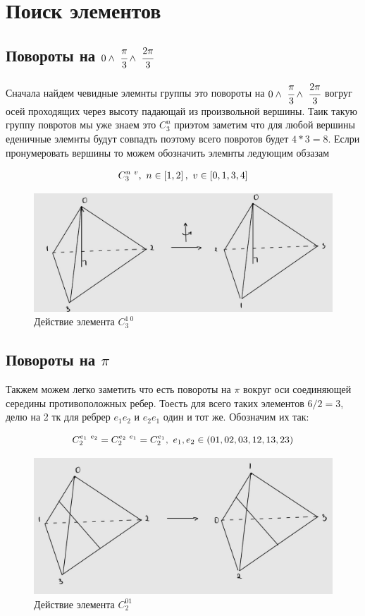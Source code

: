 \section{Поиск элементов}

\subsection{Повороты на $0 \land \ \cfrac{\pi}{3} \land \ \cfrac{2 \pi}{3}$}

Сначала найдем чевидные элемнты группы это повороты на 
$0 \land \ \cfrac{\pi}{3} \land \ \cfrac{2 \pi}{3}$ вогруг осей проходящих через 
высоту падающай из произвольной вершины. Таик такую группу 
повротов мы уже знаем это $C_3^n$ приэтом заметим что для любой вершины 
еденичные элемнты будут совпадть поэтому всего повротов будет $4*3 = 8$. 
Еслри пронумеровать вершины то можем обозначить элемнты ледующим обзазам

\begin{eqnarray}
    C_3^{n \ v}, \ n \in \left[ 1, 2 \right], \ v \in \left[ 0, 1, 3, 4 \right]
\end{eqnarray}

\begin{figure}[H]
    \centering
    \includegraphics[width=0.5\linewidth]{su/C_10_3.jpg}
    \caption{Действие элемента $C^{1 \ 0}_{3}$}
\end{figure}

\subsection{Повороты на $\pi$}

Такжем можем легко заметить что есть повороты на $\pi$ вокруг оси соединяющей
середины противоположных ребер. Тоесть для всего таких элементов $6/2 = 3$, 
делю на 2 тк для ребрер $e_1 e_2$ и $e_2 e_1$ один и тот же.  Обозначим их так:

\begin{equation}
    C_{2}^{e_1 \ e_2} = C_{2}^{e_2 \ e_1} = C_{2}^{e_1} , \ e_1, e_2 \in \left( 01, 02, 03, 12, 13, 23 \right)
\end{equation}

\begin{figure}[H]
    \centering
    \includegraphics[width=0.5\linewidth]{su/C_15_2.jpg}
    \caption{Действие элемента $C^{01}_{2}$}
\end{figure}

